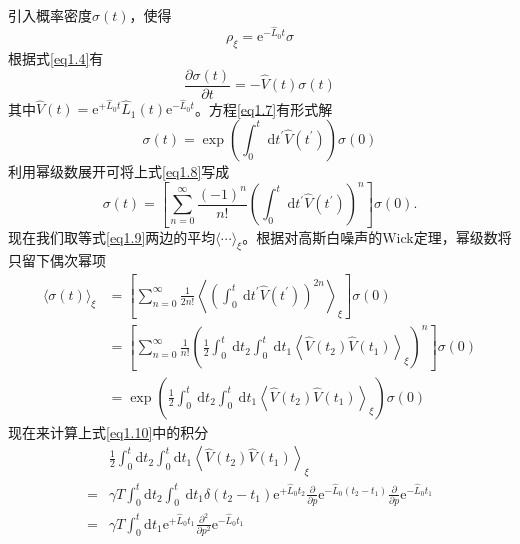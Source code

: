 引入概率密度$\sigma(t)$，使得
\begin{equation}
    \rho_{\xi}=\mathrm{e}^{-\hat{L}_{0} t} \sigma
    \label{eq1.6}
\end{equation}
根据式\eqref{eq1.4}有
\begin{equation}
    \frac{\partial \sigma(t)}{\partial t}=-\hat{V}(t) \sigma(t)
    \label{eq1.7}
\end{equation}
其中$\hat{V}(t)=\mathrm{e}^{+\hat{L}_{0} t} \hat{L}_{1}(t) \mathrm{e}^{-\hat{L}_{0} t}$。方程\eqref{eq1.7}有形式解
\begin{equation}
    \sigma(t)=\exp \left(\int_{0}^{t} \mathrm{~d} t^{\prime} \hat{V}\left(t^{\prime}\right)\right) \sigma(0)
    \label{eq1.8}
\end{equation}
利用幂级数展开可将上式\eqref{eq1.8}写成
\begin{equation}
    \sigma(t)=\left[\sum_{n=0}^{\infty} \frac{(-1)^{n}}{n !}\left(\int_{0}^{t} \mathrm{~d} t^{\prime} \hat{V}\left(t^{\prime}\right)\right)^{n}\right] \sigma(0) .
    \label{eq1.9}
\end{equation}
现在我们取等式\eqref{eq1.9}两边的平均$\langle \cdots \rangle_{\xi}$。根据对高斯白噪声的Wick定理\cite{Reichl2016}，幂级数将只留下偶次幂项
\begin{equation}
    \begin{split}
        \langle\sigma(t)\rangle_{\xi}&=\left[\sum_{n=0}^{\infty} \frac{1}{2 n !}\left\langle\left(\int_{0}^{t} \mathrm{~d} t^{\prime} \hat{V}\left(t^{\prime}\right)\right)^{2 n}\right\rangle_{\xi}\right] \sigma(0)\\
        &=\left[\sum_{n=0}^{\infty} \frac{1}{n !}\left(\frac{1}{2} \int_{0}^{t} \mathrm{~d} t_{2} \int_{0}^{t} \mathrm{~d} t_{1}\left\langle\hat{V}\left(t_{2}\right) \hat{V}\left(t_{1}\right)\right\rangle_{\xi}\right)^{n}\right] \sigma(0)\\
        &=\exp \left(\frac{1}{2} \int_{0}^{t} \mathrm{~d} t_{2} \int_{0}^{t} \mathrm{~d} t_{1}\left\langle\hat{V}\left(t_{2}\right) \hat{V}\left(t_{1}\right)\right\rangle_{\xi}\right) \sigma(0)
    \end{split}
    \label{eq1.10}
\end{equation}
现在来计算上式\eqref{eq1.10}中的积分
\begin{equation}
    \begin{split}
    &\frac{1}{2} \int_{0}^{t} \mathrm{d} t_{2} \int_{0}^{t} \mathrm{d} t_{1}\left\langle\hat{V}\left(t_{2}\right) \hat{V}\left(t_{1}\right)\right\rangle_{\xi} \\
    =&\gamma T \int_{0}^{t} \mathrm{d} t_{2} \int_{0}^{t} \mathrm{~d} t_{1} \delta\left(t_{2}-t_{1}\right) \mathrm{e}^{+\hat{L}_{0} t_{2}} \frac{\partial}{\partial p} \mathrm{e}^{-\hat{L}_{0}\left(t_{2}-t_{1}\right)} \frac{\partial}{\partial p} \mathrm{e}^{-\hat{L}_{0} t_{1}} \\
    =&\gamma T \int_{0}^{t} \mathrm{d} t_{1} \mathrm{e}^{+\hat{L}_{0} t_{1}} \frac{\partial^{2}}{\partial p^{2}} \mathrm{e}^{-\hat{L}_{0} t_{1}}   
    \end{split}
    \label{eq1.11}
\end{equation}
